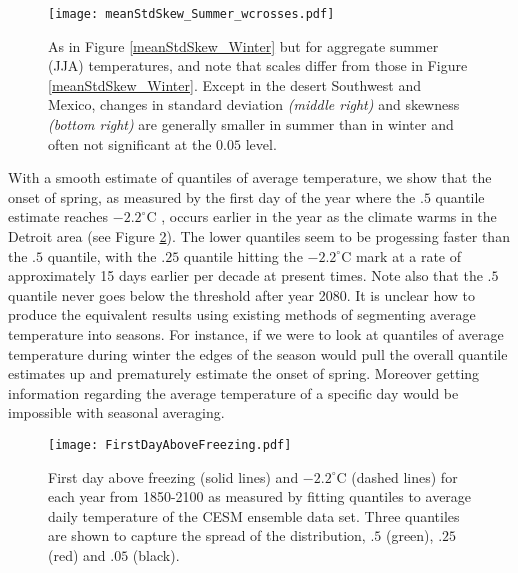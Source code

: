 \documentclass{ametsoc}
\newcommand\smallfigwidth{\columnwidth}
\begin{document}
\begin{figure}[ht]
\centerline{\texttt{[image: meanStdSkew\_Summer\_wcrosses.pdf]}}
\caption{\small{As in Figure \ref{meanStdSkew_Winter} but for aggregate summer (JJA) temperatures, and note that scales differ from those in Figure \ref{meanStdSkew_Winter}. Except in the desert Southwest and Mexico, changes in standard deviation \emph{(middle right)} and skewness \emph{(bottom right)} are generally smaller in summer than in winter and often not significant at the $0.05$ level.}}
\label{meanStdSkew_Summer}
\end{figure}




With a smooth estimate of quantiles of average temperature, we show that the onset of spring, as measured by the first day of the year where the $.5$ quantile estimate reaches $-2.2^{\circ}$C \citep{pearse2017statistical}, occurs earlier in the year as the climate warms in the Detroit area (see Figure \ref{fig:FirstDayAboveFreezing}). The lower quantiles seem to be progessing faster than the $.5$ quantile, with the $.25$ quantile hitting the $-2.2^{\circ}$C mark at a rate of approximately 15 days earlier per decade at present times. Note also that the $.5$ quantile never goes below the threshold after year 2080. It is unclear how to produce the equivalent results using existing methods of segmenting average temperature into seasons. For instance, if we were to look at quantiles of average temperature during winter the edges of the season would pull the overall quantile estimates up and prematurely estimate the onset of spring. Moreover getting information regarding the average temperature of a specific day would be impossible with seasonal averaging. 

\begin{figure}[ht]
\centerline{\texttt{[image: FirstDayAboveFreezing.pdf]}}
\caption{\small{First day above freezing (solid lines) and $-2.2^\circ$C (dashed lines) for each year from 1850-2100 as measured by fitting quantiles to average daily temperature of the CESM ensemble data set. Three quantiles are shown to capture the spread of the distribution, $.5$ (green), $.25$ (red) and $.05$ (black).}}
\label{fig:FirstDayAboveFreezing}
\end{figure}
\end{document}
